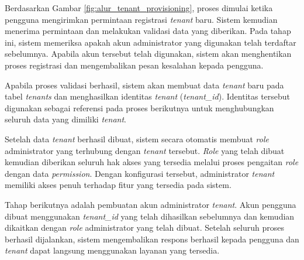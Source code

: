 Berdasarkan Gambar \ref{fig:alur_tenant_provisioning}, proses dimulai ketika pengguna mengirimkan permintaan registrasi \textit{tenant} baru. Sistem kemudian menerima permintaan dan melakukan validasi data yang diberikan. Pada tahap ini, sistem memeriksa apakah akun administrator yang digunakan telah terdaftar sebelumnya. Apabila akun tersebut telah digunakan, sistem akan menghentikan proses registrasi dan mengembalikan pesan kesalahan kepada pengguna.

Apabila proses validasi berhasil, sistem akan membuat data \textit{tenant} baru pada tabel \textit{tenants} dan menghasilkan identitas \textit{tenant} (\textit{tenant\_id}). Identitas tersebut digunakan sebagai referensi pada proses berikutnya untuk menghubungkan seluruh data yang dimiliki \textit{tenant}.

Setelah data \textit{tenant} berhasil dibuat, sistem secara otomatis membuat \textit{role} administrator yang terhubung dengan \textit{tenant} tersebut. \textit{Role} yang telah dibuat kemudian diberikan seluruh hak akses yang tersedia melalui proses pengaitan \textit{role} dengan data \textit{permission}. Dengan konfigurasi tersebut, administrator \textit{tenant} memiliki akses penuh terhadap fitur yang tersedia pada sistem.

Tahap berikutnya adalah pembuatan akun administrator \textit{tenant}. Akun pengguna dibuat menggunakan \textit{tenant\_id} yang telah dihasilkan sebelumnya dan kemudian dikaitkan dengan \textit{role} administrator yang telah dibuat. Setelah seluruh proses berhasil dijalankan, sistem mengembalikan respons berhasil kepada pengguna dan \textit{tenant} dapat langsung menggunakan layanan yang tersedia.

